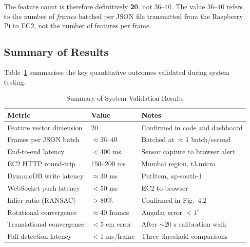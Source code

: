 The feature count is therefore definitively \textbf{20}, not 36--40. The value 36--40 refers to the number of \textit{frames} batched per JSON file transmitted from the Raspberry Pi to EC2, not the number of features per frame.

\subsection{Summary of Results}

Table~\ref{tab:results_summary} summarises the key quantitative outcomes validated during system testing.

\begin{table}[H]
\caption{Summary of System Validation Results}
\label{tab:results_summary}
\centering
\begin{tabularx}{\textwidth}{@{} l X X @{}}
\toprule
\textbf{Metric} & \textbf{Value} & \textbf{Notes} \\ \midrule
Feature vector dimension & 20 & Confirmed in code and dashboard \\
Frames per JSON batch & $\approx$36--40 & Batched at $\approx$1 batch/second \\
End-to-end latency & $<$400 ms & Sensor capture to browser alert \\
EC2 HTTP round-trip & 150--200 ms & Mumbai region, t3.micro \\
DynamoDB write latency & $\approx$30 ms & PutItem, ap-south-1 \\
WebSocket push latency & $<$50 ms & EC2 to browser \\
Inlier ratio (RANSAC) & $>$80\% & Confirmed in Fig.~4.2 \\
Rotational convergence & $\approx$40 frames & Angular error $<1^{\circ}$ \\
Translational convergence & $<$5 cm error & After $\sim$20 s calibration walk \\
Fall detection latency & $<$1 ms/frame & Three threshold comparisons \\ \bottomrule
\end{tabularx}
\end{table}